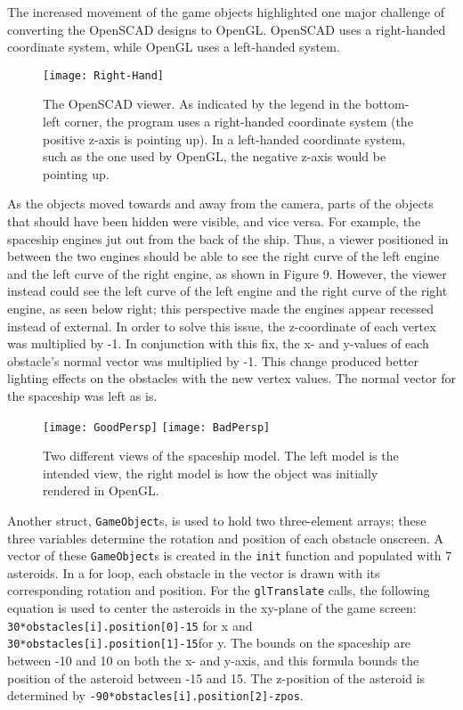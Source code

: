 \documentclass[12pt]{article}
\begin{document}
\begin{doublespace}
The increased movement of the game objects highlighted one major challenge of converting the OpenSCAD designs to OpenGL. OpenSCAD uses a right-handed coordinate system, while OpenGL uses a left-handed system.\\
\begin{figure}[h]
  \texttt{[image: Right-Hand]}
  \centering
  \caption{The OpenSCAD viewer. As indicated by the legend in the bottom-left corner, the program uses a right-handed coordinate system (the positive z-axis is pointing up). In a left-handed coordinate system, such as the one used by OpenGL, the negative z-axis would be pointing up.}
\end{figure}
As the objects moved towards and away from the camera, parts of the objects that should have been hidden were visible, and vice versa. For example, the spaceship engines jut out from the back of the ship. Thus, a viewer positioned in between the two engines should be able to see the right curve of the left engine and the left curve of the right engine, as shown in Figure 9. However, the viewer instead could see the left curve of the left engine and the right curve of the right engine, as seen below right; this perspective made the engines appear recessed instead of external. In order to solve this issue, the z-coordinate of each vertex was multiplied by -1. In conjunction with this fix, the x- and y-values of each obstacle's normal vector was multiplied by -1. This change produced better lighting effects on the obstacles with the new vertex values. The normal vector for the spaceship was left as is.
\begin{figure}[h]
  \texttt{[image: GoodPersp]}
  \texttt{[image: BadPersp]}
  \centering
  \caption{Two different views of the spaceship model. The left model is the intended view, the right model is how the object was initially rendered in OpenGL.}
\end{figure}

Another struct, \texttt{GameObject}s, is used to hold two three-element arrays; these three variables determine the rotation and position of each obstacle onscreen. A vector of these \texttt{GameObject}s is created in the \texttt{init} function and populated with 7 asteroids. In a for loop, each obstacle in the vector is drawn with its corresponding rotation and position. For the \texttt{glTranslate} calls, the following equation is used to center the asteroids in the xy-plane of the game screen: \texttt{30*obstacles[i].position[0]-15} for x and \texttt{30*obstacles[i].position[1]-15}for y. The bounds on the spaceship are between -10 and 10 on both the x- and y-axis, and this formula bounds the position of the asteroid between -15 and 15. The z-position of the asteroid is determined by \texttt{-90*obstacles[i].position[2]-zpos}.\\


\end{doublespace}
\end{document}
